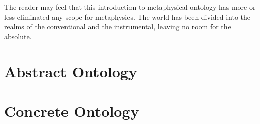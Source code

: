 \documentclass{rbjk}
\begin{document}
\begin{article}
The reader may feel that this introduction to metaphysical ontology has more or less eliminated any scope for metaphysics.
The world has been divided into the realms of the conventional and the instrumental, leaving no room for the absolute.



\section{Abstract Ontology}

\section{Concrete Ontology}

%
%

\end{article}
\end{document}
